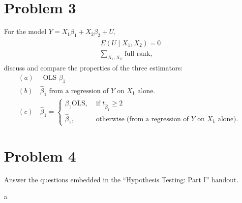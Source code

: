 \documentclass{article}
\begin{document}
\newpage

\section*{Problem 3}
 For the model $Y=X_{1} \beta_{1}+X_{2} \beta_{2}+U$,
\begin{align*}
\begin{aligned}
&E\left(U \mid X_{1}, X_{2}\right)=0 \\
&\sum_{X_{1}, X_{2}} \text { full rank, }
\end{aligned}
\end{align*}
discuss and compare the properties of the three estimators: \\
\begin{align*}
    &(a) \quad \text{ OLS } \beta_{1} \\
    &(b) \quad \hat{\beta}_{1} \text{ from a regression of $Y$ on $X_{1}$ alone.} \\
    &(c) \quad \hat{\beta}_{1}= 
        \begin{cases}
            \beta_{1} \mathrm{OLS}, & \text { if } t_{\hat{\beta}_{1}} \geq 2 \\ 
            \hat{\beta}_{1}, & \text{ otherwise (from a regression of } Y \text{ on } X_{1} \text { alone). }
        \end{cases}    
\end{align*}

\begin{solution}
\end{solution}

\newpage

\section*{Problem 4}
Answer the questions embedded in the ``Hypothesis Testing: Part I'' handout.


\begin{problem}{a}
\end{problem}
\begin{solution}
\end{solution}

\newpage

\end{document}
